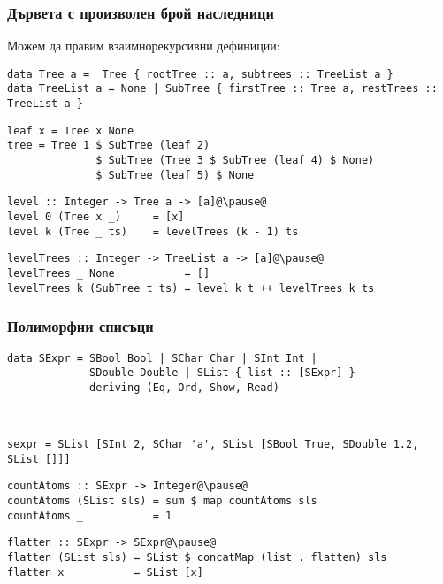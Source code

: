 \documentclass[alsotrans]{beamerswitch}
\begin{document}
\begin{frame}[fragile]
  \frametitle{Дървета с произволен брой наследници}
\small
  Можем да правим \alert{взаимнорекурсивни} дефиниции:
\begin{lstlisting}
data Tree a =  Tree { rootTree :: a, subtrees :: TreeList a }
data TreeList a = None | SubTree { firstTree :: Tree a, restTrees :: TreeList a }
\end{lstlisting}
\pause
\begin{lstlisting}
leaf x = Tree x None
tree = Tree 1 $ SubTree (leaf 2)
              $ SubTree (Tree 3 $ SubTree (leaf 4) $ None)
              $ SubTree (leaf 5) $ None
\end{lstlisting}
\pause
\begin{lstlisting}
level :: Integer -> Tree a -> [a]@\pause@
level 0 (Tree x _)     = [x]
level k (Tree _ ts)    = levelTrees (k - 1) ts
\end{lstlisting}
\pause
\begin{lstlisting}
levelTrees :: Integer -> TreeList a -> [a]@\pause@
levelTrees _ None           = []
levelTrees k (SubTree t ts) = level k t ++ levelTrees k ts
\end{lstlisting}
\end{frame}

\begin{frame}[fragile]
  \frametitle{Полиморфни списъци}
\small
\begin{lstlisting}
data SExpr = SBool Bool | SChar Char | SInt Int |
             SDouble Double | SList { list :: [SExpr] }
             deriving (Eq, Ord, Show, Read)
\end{lstlisting}
  \ \pause
\begin{lstlisting}
sexpr = SList [SInt 2, SChar 'a', SList [SBool True, SDouble 1.2, SList []]]
\end{lstlisting}
  \pause
\begin{lstlisting}
countAtoms :: SExpr -> Integer@\pause@
countAtoms (SList sls) = sum $ map countAtoms sls
countAtoms _           = 1
\end{lstlisting}
  \pause
\begin{lstlisting}
flatten :: SExpr -> SExpr@\pause@
flatten (SList sls) = SList $ concatMap (list . flatten) sls
flatten x           = SList [x]
\end{lstlisting}
\end{frame}
\end{document}
